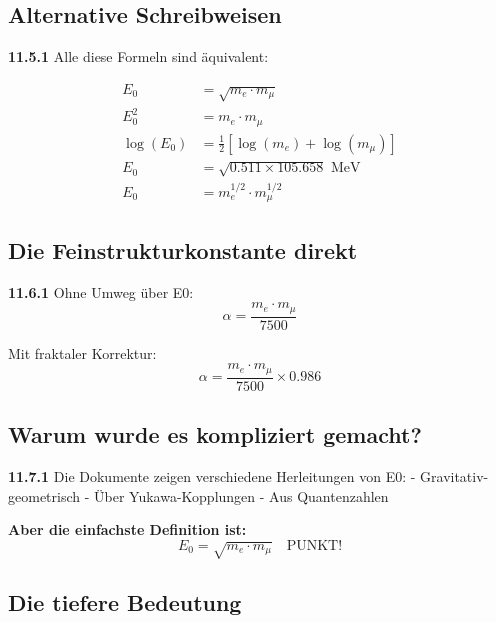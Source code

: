 \documentclass[12pt,a4paper]{article}
\begin{document}
\subsection{Alternative Schreibweisen}

\noindent \textbf{11.5.1} Alle diese Formeln sind äquivalent:

\begin{align}
	E_0 &= \sqrt{m_e \cdot m_\mu} \\
	E_0^2 &= m_e \cdot m_\mu \\
	\log(E_0) &= \frac{1}{2}[\log(m_e) + \log(m_\mu)] \\
	E_0 &= \sqrt{0.511 \times 105.658} \text{ MeV} \\
	E_0 &= m_e^{1/2} \cdot m_\mu^{1/2}
\end{align}

\subsection{Die Feinstrukturkonstante direkt}

\begin{tcolorbox}[colback=green!5!white,colframe=green!75!black,title=\textbf{Die direkteste Formel}]
	\noindent \textbf{11.6.1} Ohne Umweg über E0:
	\begin{equation}
		\boxed{\alpha = \frac{m_e \cdot m_\mu}{7500}}
	\end{equation}
	
	Mit fraktaler Korrektur:
	\begin{equation}
		\boxed{\alpha = \frac{m_e \cdot m_\mu}{7500} \times 0.986}
	\end{equation}
\end{tcolorbox}

\subsection{Warum wurde es kompliziert gemacht?}

\noindent \textbf{11.7.1} Die Dokumente zeigen verschiedene Herleitungen von E0:
- Gravitativ-geometrisch
- Über Yukawa-Kopplungen
- Aus Quantenzahlen

\textbf{Aber die einfachste Definition ist:}
\begin{equation}
	\boxed{E_0 = \sqrt{m_e \cdot m_\mu} \quad \text{PUNKT!}}
\end{equation}

\subsection{Die tiefere Bedeutung}
\end{document}
